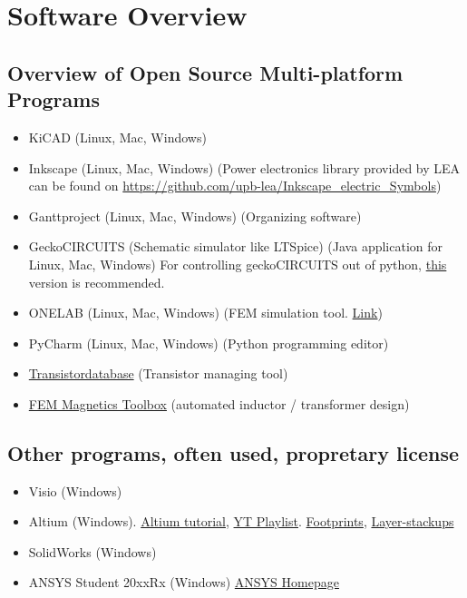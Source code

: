 \chapter{Software Overview} 

\section{Overview of Open Source Multi-platform Programs}
\begin{itemize}
	\item KiCAD (Linux, Mac, Windows)
	\item Inkscape (Linux, Mac, Windows) (Power electronics library provided by LEA can be found on \href{https://github.com/upb-lea/Inkscape_electric_Symbols}{https://github.com/upb-lea/Inkscape\_electric\_Symbols})
	\item Ganttproject (Linux, Mac, Windows) (Organizing software)
	\item GeckoCIRCUITS (Schematic simulator like LTSpice) (Java application for Linux, Mac, Windows) For controlling geckoCIRCUITS out of python, \href{https://github.com/tinix84/gecko/releases/tag/v1.1}{this} version is recommended.
	\item ONELAB (Linux, Mac, Windows) (FEM simulation tool. \href{https://onelab.info/}{Link})
	\item PyCharm (Linux, Mac, Windows) (Python programming editor)
	\item \href{https://github.com/upb-lea/transistordatabase}{Transistordatabase} (Transistor managing tool)
	\item \href{https://github.com/upb-lea/FEM_Magnetics_Toolbox}{FEM Magnetics Toolbox} (automated inductor / transformer design)
\end{itemize}

\section{Other programs, often used, propretary license}
\begin{itemize}
	\item Visio (Windows)
	\item Altium (Windows). \href{https://resources.altium.com/p/getting-started-pcb-design}{Altium tutorial}, \href{https://www.youtube.com/playlist?app=desktop&list=PLXvLToQzgzdfKKQn2wmpuSXz6sROQmO6R}{YT Playlist}. \href{https://altiumlibrary.com/}{Footprints}, \href{https://www.we-online.com/web/en/leiterplatten/produkte_/multilayer_leiterplatten/aufbauten_1/aufbauten_altium_1/aufbauten_4.php}{Layer-stackups}
	\item SolidWorks (Windows)
	\item ANSYS Student 20xxRx (Windows) \href{https://www.ansys.com/de-de/academic/free-student-products}{ANSYS Homepage} 
\end{itemize}